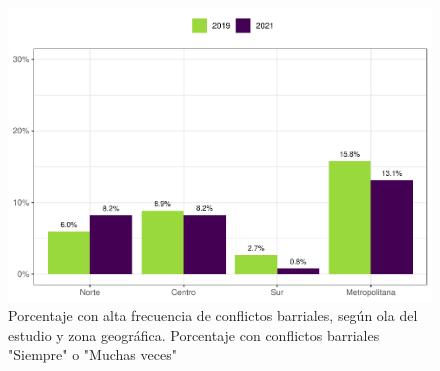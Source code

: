 \documentclass[
  12pt,
]{book}
\begin{document}
\begin{figure}

{\centering \includegraphics{reporte-elsoc_files/figure-latex/confli-zona-1} 

}

\caption{Porcentaje con alta frecuencia de conflictos barriales, según ola del estudio y zona geográfica. Porcentaje con conflictos barriales "Siempre" o "Muchas veces"}\label{fig:confli-zona}
\end{figure}
\end{document}
